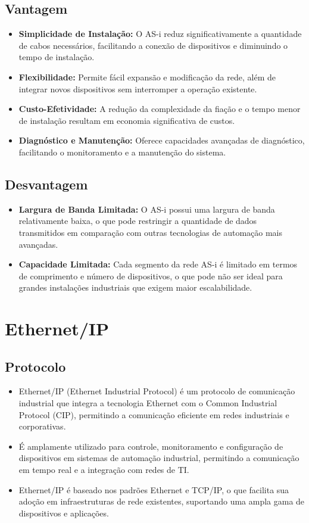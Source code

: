 \documentclass[a4paper,11pt]{article} %
\begin{document}
\subsection{Vantagem}
\begin{itemize}
    \item \textbf{Simplicidade de Instalação:} O AS-i reduz significativamente a quantidade de cabos necessários, facilitando a conexão de dispositivos e diminuindo o tempo de instalação.
    \item \textbf{Flexibilidade:} Permite fácil expansão e modificação da rede, além de integrar novos dispositivos sem interromper a operação existente.
    \item \textbf{Custo-Efetividade:} A redução da complexidade da fiação e o tempo menor de instalação resultam em economia significativa de custos.
    \item \textbf{Diagnóstico e Manutenção:} Oferece capacidades avançadas de diagnóstico, facilitando o monitoramento e a manutenção do sistema.
\end{itemize}

\subsection{Desvantagem}
\begin{itemize}
    \item \textbf{Largura de Banda Limitada:} O AS-i possui uma largura de banda relativamente baixa, o que pode restringir a quantidade de dados transmitidos em comparação com outras tecnologias de automação mais avançadas.
    \item \textbf{Capacidade Limitada:} Cada segmento da rede AS-i é limitado em termos de comprimento e número de dispositivos, o que pode não ser ideal para grandes instalações industriais que exigem maior escalabilidade.
\end{itemize}

\section{Ethernet/IP}

\subsection{Protocolo}
\begin{itemize}
    \item Ethernet/IP (Ethernet Industrial Protocol) é um protocolo de comunicação industrial que integra a tecnologia Ethernet com o Common Industrial Protocol (CIP), permitindo a comunicação eficiente em redes industriais e corporativas.
    \item É amplamente utilizado para controle, monitoramento e configuração de dispositivos em sistemas de automação industrial, permitindo a comunicação em tempo real e a integração com redes de TI.
    \item Ethernet/IP é baseado nos padrões Ethernet e TCP/IP, o que facilita sua adoção em infraestruturas de rede existentes, suportando uma ampla gama de dispositivos e aplicações.
\end{itemize}
\end{document}
